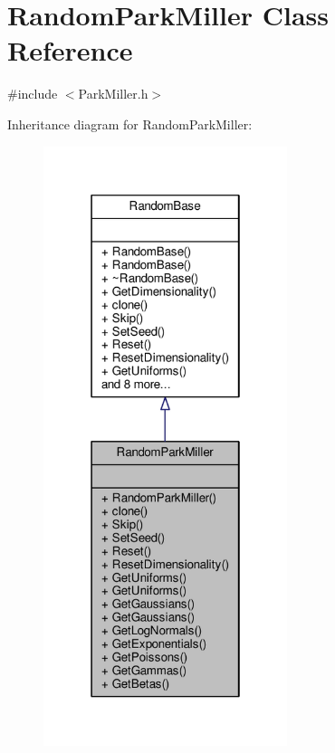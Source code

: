 \hypertarget{classRandomParkMiller}{}\section{Random\+Park\+Miller Class Reference}
\label{classRandomParkMiller}


{\ttfamily \#include $<$Park\+Miller.\+h$>$}



Inheritance diagram for Random\+Park\+Miller\+:
\nopagebreak
\begin{figure}[H]
\begin{center}
\leavevmode
\includegraphics[width=202pt]{classRandomParkMiller__inherit__graph}
\end{center}
\end{figure}


